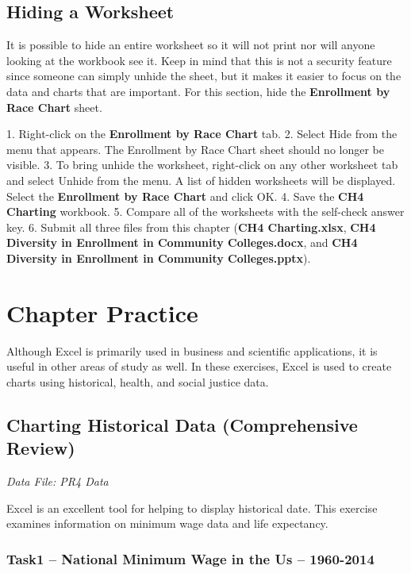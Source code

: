 \subsection{Hiding a Worksheet}

It is possible to hide an entire worksheet so it will not print nor will anyone looking at the workbook see it. Keep in mind that this is not a security feature since someone can simply unhide the sheet, but it makes it easier to focus on the data and charts that are important. For this section, hide the \textbf{Enrollment by Race Chart} sheet.

1. Right-click on the \textbf{Enrollment by Race Chart} tab.
2. Select Hide from the menu that appears. The Enrollment by Race Chart sheet should no longer be visible.
3. To bring unhide the worksheet, right-click on any other worksheet tab and select Unhide from the menu. A list of hidden worksheets will be displayed. Select the \textbf{Enrollment by Race Chart} and click OK.
4. Save the \textbf{CH4 Charting} workbook.
5. Compare all of the worksheets with the self-check answer key.
6. Submit all three files from this chapter (\textbf{CH4 Charting.xlsx}, \textbf{CH4 Diversity in Enrollment in Community Colleges.docx}, and \textbf{CH4 Diversity in Enrollment in Community Colleges.pptx}).

\section{Chapter Practice}

Although Excel is primarily used in business and scientific applications, it is useful in other areas of study as well. In these exercises, Excel is used to create charts using historical, health, and social justice data.

\subsection{Charting Historical Data (Comprehensive Review)}

\textit{Data File: PR4 Data}

Excel is an excellent tool for helping to display historical date. This exercise examines information on minimum wage data and life expectancy.

\subsubsection{Task1 – National Minimum Wage in the Us – 1960-2014}

